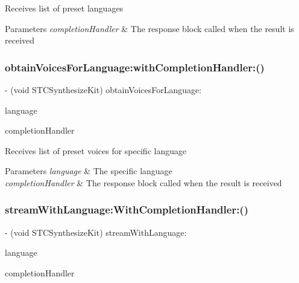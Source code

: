 Receives list of preset languages 
\begin{DoxyParams}{Parameters}
{\em completion\+Handler} & The response block called when the result is received \\
\hline
\end{DoxyParams}
\hypertarget{protocol_s_t_c_synthesize_kit_01-p_a8c6e4b0dd69c33d0044135976941a706}{}\label{protocol_s_t_c_synthesize_kit_01-p_a8c6e4b0dd69c33d0044135976941a706} 
\subsubsection{\texorpdfstring{obtain\+Voices\+For\+Language\+:with\+Completion\+Handler\+:()}{obtainVoicesForLanguage:withCompletionHandler:()}}
{\footnotesize\ttfamily -\/ (void S\+T\+C\+Synthesize\+Kit) obtain\+Voices\+For\+Language\+: \begin{DoxyParamCaption}\item[{(N\+S\+String $\ast$)}]{language }\item[{withCompletionHandler:(Voices\+Completion\+Handler)}]{completion\+Handler }\end{DoxyParamCaption}}

Receives list of preset voices for specific language 
\begin{DoxyParams}{Parameters}
{\em language} & The specific language \\
\hline
{\em completion\+Handler} & The response block called when the result is received \\
\hline
\end{DoxyParams}
\hypertarget{protocol_s_t_c_synthesize_kit_01-p_a99ae6df6d921250b4bfe2c20e0dfbf97}{}\label{protocol_s_t_c_synthesize_kit_01-p_a99ae6df6d921250b4bfe2c20e0dfbf97} 
\subsubsection{\texorpdfstring{stream\+With\+Language\+:\+With\+Completion\+Handler\+:()}{streamWithLanguage:WithCompletionHandler:()}}
{\footnotesize\ttfamily -\/ (void S\+T\+C\+Synthesize\+Kit) stream\+With\+Language\+: \begin{DoxyParamCaption}\item[{(N\+S\+String $\ast$)}]{language }\item[{WithCompletionHandler:(Stream\+Completion\+Handler)}]{completion\+Handler }\end{DoxyParamCaption}}

